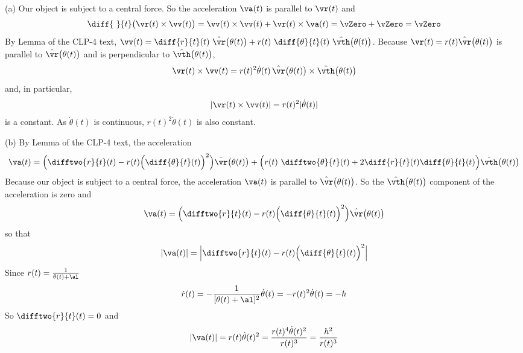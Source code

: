 \begin{solution} 
(a)
Our object is subject to a central force. So the acceleration $\va(t)$
is parallel to $\vr(t)$ and
\begin{equation*}
\diff{\ }{t}\big(\vr(t)\times\vv(t)\big)
=\vv(t)\times\vv(t) + \vr(t)\times\va(t)
=\vZero +\vZero
=\vZero
\end{equation*}
By Lemma  of the CLP-4 text,
$\vv(t) = \diff{r}{t}(t)\ \hat\vr\big(\theta(t)\big) 
             + r(t)\ \diff{\theta}{t}(t)\ \hat\vth\big(\theta(t)\big)$.
Because $\vr(t)=r(t)\hat\vr\big(\theta(t)\big)$ is parallel to 
$\hat\vr\big(\theta(t)\big)$ and is perpendicular to 
$\hat\vth\big(\theta(t)\big)$,
\begin{equation*}
\vr(t)\times\vv(t)
=r(t)^2\dot\theta(t)\,\hat\vr\big(\theta(t)\big)\times
                       \hat\vth\big(\theta(t)\big)
\end{equation*}
and, in particular,
\begin{equation*}
|\vr(t)\times\vv(t)| = r(t)^2|\dot\theta(t)|
\end{equation*}
is a constant. As $\dot\theta(t)$ is continuous, $r(t)^2\dot\theta(t)$
is also constant.

(b) 
By Lemma  of the CLP-4 text,
the acceleration
\begin{equation*}
\va(t) = \Big(\difftwo{r}{t}(t)-r(t)\Big(\diff{\theta}{t}(t)\Big)^2\Big) 
             \hat\vr\big(\theta(t)\big)
   +\Big(r(t)\ \difftwo{\theta}{t}(t) 
          + 2 \diff{r}{t}(t)\diff{\theta}{t}(t)\Big)
                  \hat\vth\big(\theta(t)\big)
\end{equation*}
Because our object is subject to a central force, the acceleration 
$\va(t)$ is parallel to $\hat\vr\big(\theta(t)\big)$. So the 
$\hat\vth\big(\theta(t)\big)$ component of the acceleration is zero 
and
\begin{equation*}
\va(t) = \Big(\difftwo{r}{t}(t)-r(t)\Big(\diff{\theta}{t}(t)\Big)^2\Big) 
             \hat\vr\big(\theta(t)\big)
\end{equation*}
so that
\begin{equation*}
|\va(t)| = \Big|\difftwo{r}{t}(t)-r(t)\Big(\diff{\theta}{t}(t)\Big)^2\Big|
\end{equation*}
Since $r(t)=\frac{1}{\theta(t)+\al}$
\begin{align*}
\dot r(t) = - \frac{1}{[\theta(t)+\al]^2}\dot\theta(t)
          =- r(t)^2 \dot\theta(t) =-h
\end{align*}
So $\difftwo{r}{t}(t)=0$ and
\begin{align*}
|\va(t)| = r(t)\dot\theta(t)^2
=\frac{r(t)^4\dot\theta(t)^2}{r(t)^3}
=\frac{h^2}{r(t)^3}
\end{align*}

\end{solution}






